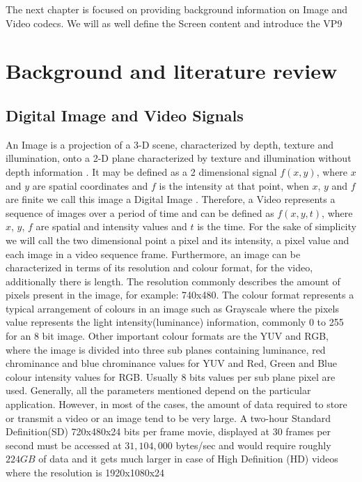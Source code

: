 \documentclass[a4paper,11pt,oneside]{article}
\begin{document}
\indent The next chapter is focused on providing background information on Image and Video codecs. We will as well define the Screen content and introduce the VP9 \\

\newpage
\section{Background and literature review}
\subsection{Digital Image and Video Signals}
\indent An Image is a projection of a 3-D scene, characterized by depth, texture and illumination, onto a 2-D plane characterized by texture and illumination
without depth information \cite[p.~5]{richardson2002video}. It may be defined as a 2 dimensional signal $ f(x, y) $, where $x$ and $y$ are spatial
coordinates and $f$ is the intensity at that point, when $x$, $y$ and $f$ are finite we call this image a Digital Image \cite[p.~1]{gonzalez2008digital}.
Therefore, a Video represents a sequence of images over a period of time and can be defined as $f(x,y,t)$, where $x$, $y$, $f$ are spatial and intensity values
and $t$ is the time.
For the sake of simplicity we will call the two dimensional point a pixel and its intensity, a pixel value and each image in a video sequence frame.
Furthermore, an image can be characterized in terms of its resolution and colour format, for the video, additionally there is length. The resolution
commonly describes the amount of pixels present in the image, for example: 740x480. The colour format represents a typical arrangement of colours in an image such as Grayscale
where the pixels value represents the light intensity(luminance) information, commonly 0 to 255 for an 8 bit image. Other important colour formats are the YUV and RGB, where the
image is divided into three sub planes containing luminance, red chrominance and blue chrominance values for YUV and Red, Green and Blue colour intensity values for RGB. Usually 8
bits values per sub plane pixel are used. Generally, all the parameters mentioned depend on the particular application. However, in most of the cases, the amount of data required to
store or transmit a video or an image tend to be very large. A two-hour Standard Definition(SD) 720x480x24 bits per frame movie, displayed at 30 frames per second must be accessed
at $ 31,104,000 $ bytes/sec
and would require roughly $224 GB$ of data and it gets much larger in case of High Definition (HD) videos where the resolution is 1920x1080x24 \cite[p.~525-526]{gonzalez2008digital} \\
\end{document}
